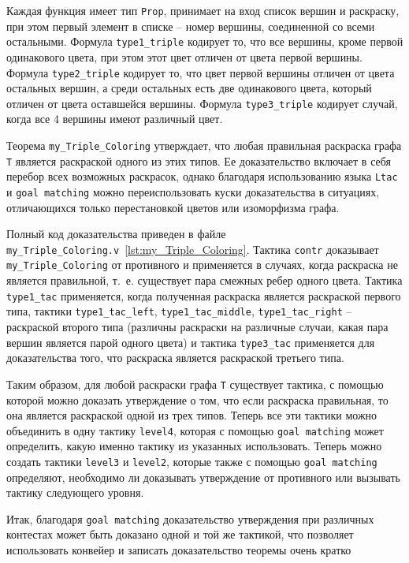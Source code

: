 Каждая функция имеет тип {\tt Prop}, принимает на вход список вершин и раскраску, при этом первый элемент в списке -- номер вершины, соединенной со всеми остальными. Формула {\tt type1\_triple} кодирует то, что все вершины, кроме первой одинакового цвета, при этом этот цвет отличен от цвета первой вершины. Формула {\tt type2\_triple} кодирует то, что цвет первой вершины отличен от цвета остальных вершин, а среди остальных есть две одинакового цвета, который отличен от цвета оставшейся вершины. Формула {\tt type3\_triple} кодирует случай, когда все 4 вершины имеют различный цвет.

Теорема {\tt my\_Triple\_Coloring} утверждает, что любая правильная раскраска графа {\tt T} является раскраской одного из этих типов. Ее доказательство включает в себя перебор всех возможных раскрасок, однако благодаря использованию языка {\tt Ltac} и {\tt goal matching} можно переиспользовать куски доказательства в ситуациях, отличающихся только перестановкой цветов или изоморфизма графа.

Полный код доказательства приведен в файле {\tt my\_Triple\_Coloring.v}~\ref{lst:my_Triple_Coloring}. Тактика {\tt contr} доказывает {\tt my\_Triple\_Coloring} от противного и применяется в случаях, когда раскраска не является правильной, т.~е. существует пара смежных ребер одного цвета. Тактика {\tt type1\_tac} применяется, когда полученная раскраска является раскраской первого типа, тактики {\tt type1\_tac\_left}, {\tt type1\_tac\_middle}, {\tt type1\_tac\_right} -- раскраской второго типа (различны раскраски на различные случаи, какая пара вершин является парой одного цвета) и тактика {\tt type3\_tac} применяется для доказательства того, что раскраска является раскраской третьего типа.

Таким образом, для любой раскраски графа {\tt T} существует тактика, с помощью которой можно доказать утверждение о том, что если раскраска правильная, то она является раскраской одной из трех типов. Теперь все эти тактики можно объединить в одну тактику {\tt level4}, которая с помощью {\tt goal matching} может определить, какую именно тактику из указанных использовать. Теперь можно создать тактики {\tt level3} и {\tt level2}, которые также с помощью {\tt goal matching} определяют, необходимо ли доказывать утверждение от противного или вызывать тактику следующего уровня.

Итак, благодаря {\tt goal matching} доказательство утверждения при различных контестах может быть доказано одной и той же тактикой, что позволяет использовать конвейер и записать доказательство теоремы очень кратко

